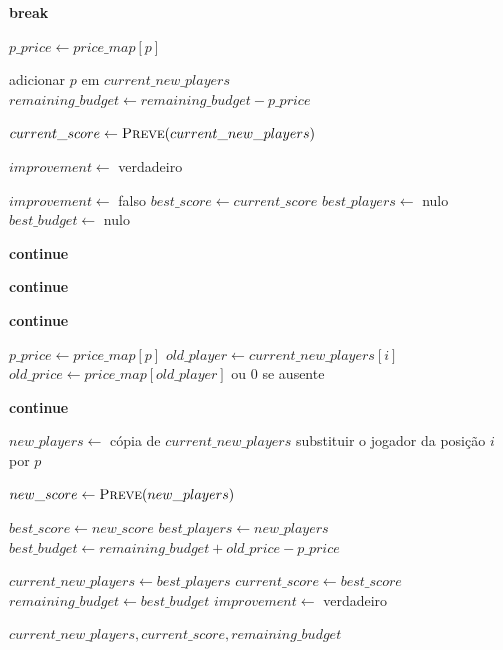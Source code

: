 \begin{breakablealgorithm}
\begin{algorithmic}[1]
        \State \textbf{break}
    \EndIf

    \State $p\_price \gets price\_map[p]$

        \State adicionar $p$ em $current\_new\_players$
        \State $remaining\_budget \gets remaining\_budget - p\_price$
    \EndIf
\EndFor

\State $current\_score \gets \textsc{Preve}(current\_new\_players)$

\State $improvement \gets$ verdadeiro

    \State $improvement \gets$ falso
    \State $best\_score \gets current\_score$
    \State $best\_players \gets$ nulo
    \State $best\_budget \gets$ nulo


                \State \textbf{continue}
            \EndIf

                \State \textbf{continue}
            \EndIf

                \State \textbf{continue}
            \EndIf

            \State $p\_price \gets price\_map[p]$
            \State $old\_player \gets current\_new\_players[i]$
            \State $old\_price \gets price\_map[old\_player]$ ou $0$ se ausente

                \State \textbf{continue}
            \EndIf

            \State $new\_players \gets$ cópia de $current\_new\_players$
            \State substituir o jogador da posição $i$ por $p$

            \State $new\_score \gets \textsc{Preve}(new\_players)$

                \State $best\_score \gets new\_score$
                \State $best\_players \gets new\_players$
                \State $best\_budget \gets remaining\_budget + old\_price - p\_price$
            \EndIf

        \EndFor
    \EndFor

        \State $current\_new\_players \gets best\_players$
        \State $current\_score \gets best\_score$
        \State $remaining\_budget \gets best\_budget$
        \State $improvement \gets$ verdadeiro
    \EndIf

\EndWhile

\State \Return $current\_new\_players, current\_score, remaining\_budget$

\EndFunction

\end{algorithmic}
\end{breakablealgorithm}